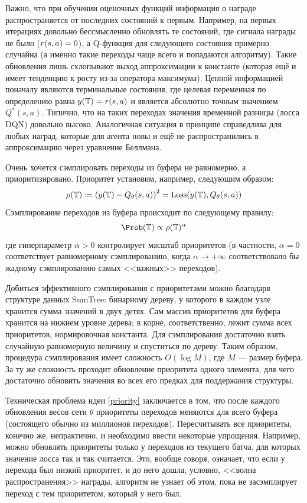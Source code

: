 Важно, что при обучении оценочных функций информация о награде распространяется от последних состояний к первым. Например, на первых итерациях довольно бессмысленно обновлять те состояний, где сигнала награды не было ($r(s, a) \HM= 0$), а Q-функция для следующего состояния примерно случайна (а именно такие переходы чаще всего и попадаются алгоритму). Такие обновления лишь схлопывают выход аппроксимации к константе (которая ещё и имеет тенденцию к росту из-за оператора максимума). Ценной информацией поначалу являются терминальные состояния, где целевая переменная по определению равна $y(\mathbb{T} ) = r(s, a)$ и является абсолютно точным значением $Q^*(s, a)$. Типично, что на таких переходах значения временной разницы (лосса DQN) довольно высоко. Аналогичная ситуация в принципе справедлива для любых наград, которые для агента новы и ещё не распространились в аппроксимацию через уравнение Беллмана.

Очень хочется сэмплировать переходы из буфера не равномерно, а приоритизировано. Приоритет установим, например, следующим образом:
\begin{equation}\label{priority}
    \rho(\mathbb{T} ) \coloneqq \left( y(\mathbb{T} ) - Q_{\theta}(s, a) \right)^2 = \operatorname{Loss}(y(\mathbb{T} ), Q_{\theta}(s, a))
\end{equation}
Сэмплирование переходов из буфера происходит по следующему правилу:
$$\Prob ( \T ) \propto \rho( \T )^\alpha$$
где гиперпараметр $\alpha > 0$ контролирует масштаб приоритетов (в частности, $\alpha = 0$ соответствует равномерному сэмплированию, когда $\alpha \to +\infty$ соответствовало бы жадному сэмплированию самых <<важных>> переходов).

\begin{remark}
Добиться эффективного сэмплирования с приоритетами можно благодаря структуре данных SumTree: бинарному дереву, у которого в каждом узле хранится сумма значений в двух детях. Сам массив приоритетов для буфера хранится на нижнем уровне дерева; в корне, соответственно, лежит сумма всех приоритетов, нормировочная константа. Для сэмплирования достаточно взять случайную равномерную величину и спуститься по дереву. Таким образом, процедура сэмплирования имеет сложность $O(\log M)$, где $M$ --- размер буфера. За ту же сложность проходит обновление приоритета одного элемента, для чего достаточно обновить значения во всех его предках для поддержания структуры.
\end{remark}

Техническая проблема идеи \eqref{priority} заключается в том, что после каждого обновления весов сети $\theta$ приоритеты переходов меняются для всего буфера (состоящего обычно из миллионов переходов). Пересчитывать все приоритеты, конечно же, непрактично, и необходимо ввести некоторые упрощения. Например, можно обновлять приоритеты только у переходов из текущего батча, для которых значение лосса так и так считается. Это, вообще говоря, означает, что если у перехода был низкий приоритет, и до него дошла, условно, <<волна распространения>> награды, алгоритм не узнает об этом, пока не засэмплирует переход с тем приоритетом, который у него был.

